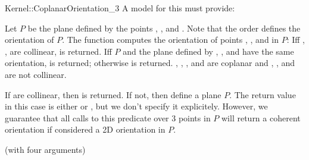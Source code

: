 \begin{ccRefFunctionObjectConcept}{Kernel::CoplanarOrientation_3}
A model for this must provide:


         {Let $P$ be the plane defined by the points , ,
          and . Note that the order defines the orientation of
          $P$. The function computes the orientation of points , 
          , and  in $P$: Iff , ,  are
          collinear,  is returned. Iff $P$ and the plane 
          defined by , , and  have the same orientation, 
           is returned; otherwise  is returned.  
          \ccPrecond {}, , , and  are coplanar and
          , , and  are not collinear.}

{If  are collinear, then  is returned.
If not, then  define a plane $P$.  The return value in this case is
either  or , but we don't specify it explicitely.
However, we guarantee that all calls to this predicate over 3 points in $P$
will return a coherent orientation if considered a 2D orientation in $P$.}


\ccRefines
{} (with four arguments)

\ccSeeAlso
{}\\

\end{ccRefFunctionObjectConcept}

